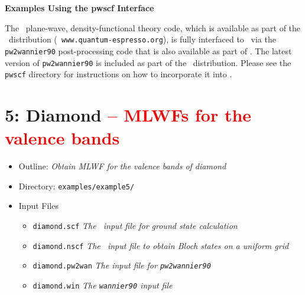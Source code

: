 \documentclass[a4paper,11pt,twoside]{article}
\def\tent#1{\textcolor{red}{#1}}     %
\begin{document}
\cleardoublepage

\begin{center}
\Large{\bf Examples Using the {\sc pwscf} Interface}
\end{center}

The \pwscf\ plane-wave, density-functional theory code, which is
available as part of the \QE\ distribution ({\tt
  www.quantum-espresso.org}), is fully interfaced to \wannier\ via the
{\tt pw2wannier90} post-processing code that is also available as part
of \QE. The latest version of {\tt pw2wannier90} is included as part of 
the \wannier\ distribution. Please see the {\tt pwscf} directory for 
instructions on how to incorporate it into \pwscf. 


\cleardoublepage

\section*{5: Diamond \tent{-- MLWFs for the valence bands}}
\begin{itemize}
\item{Outline: \it{Obtain MLWF for the valence bands of diamond}}
\item{Directory: {\tt examples/example5/}}
\item{Input Files}
\begin{itemize}
\item{ {\tt diamond.scf}  {\it The \pwscf\ input file for ground state
    calculation}} 
\item{ {\tt diamond.nscf}  {\it The \pwscf\ input file to obtain Bloch
    states on a uniform grid}} 
\item{ {\tt diamond.pw2wan}  {\it The input file for {\tt pw2wannier90}}}
\item{ {\tt diamond.win}  {\it The {\tt wannier90} input file}}
\end{itemize}
\end{itemize}
\end{document}
